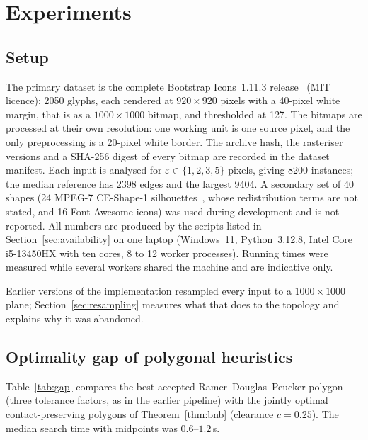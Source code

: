 \documentclass[11pt,a4paper]{article}
\theoremstyle{definition}
\theoremstyle{remark}
\begin{document}
\section{Experiments}

\subsection{Setup}

The primary dataset is the complete Bootstrap Icons~1.11.3
release~\cite{bootstrapicons} (MIT licence): 2050 glyphs, each rendered at
$920\times920$ pixels with a 40-pixel white margin, that is as a
$1000\times1000$ bitmap, and thresholded at 127. The bitmaps are processed at
their own resolution: one working unit is one source pixel, and the only
preprocessing is a 20-pixel white border. The archive hash, the rasteriser
versions and a SHA-256 digest of every bitmap are recorded in the dataset
manifest. Each input is analysed for $\varepsilon\in\{1,2,3,5\}$ pixels,
giving 8200 instances; the median reference has 2398 edges and the largest
9404. A secondary set of 40 shapes (24 MPEG-7 CE-Shape-1
silhouettes~\cite{latecki2000}, whose redistribution terms are not stated, and
16 Font Awesome icons) was used during development and is not reported. All
numbers are produced by the scripts listed in Section~\ref{sec:availability}
on one laptop (Windows~11, Python~3.12.8, Intel Core i5-13450HX with ten
cores, 8 to 12 worker processes). Running times were measured while several
workers shared the machine and are indicative only.

Earlier versions of the implementation resampled every input to a
$1000\times1000$ plane; Section~\ref{sec:resampling} measures what that does
to the topology and explains why it was abandoned.

\subsection{Optimality gap of polygonal heuristics}

Table~\ref{tab:gap} compares the best accepted Ramer--Douglas--Peucker polygon
(three tolerance factors, as in the earlier pipeline) with the jointly optimal
contact-preserving polygons of Theorem~\ref{thm:bnb} (clearance $c=0.25$).
The median search time with midpoints was $0.6$--$1.2$\,s.
\end{document}
